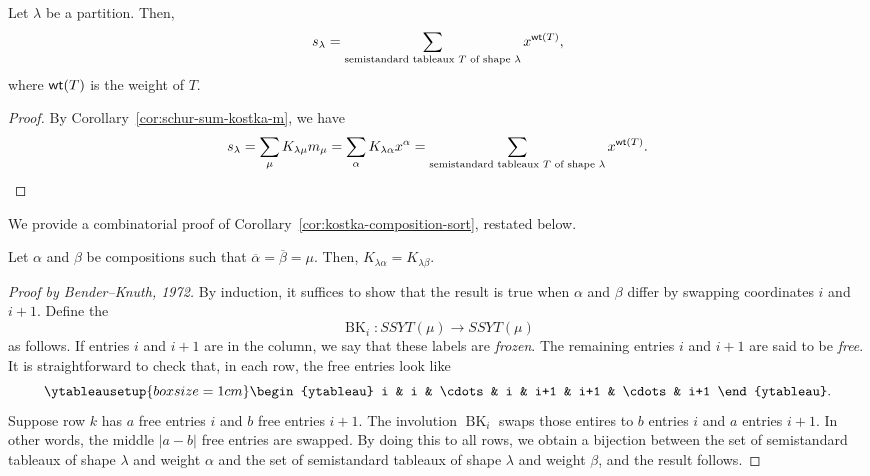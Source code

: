 \begin{corollary}
    Let \(\lambda\) be a partition.
    Then,
    \begin{equation}
        s_{\lambda} = \sum_{\text{semistandard tableaux } T \text{ of shape } \lambda} x^{\operatorname{\mathsf{wt}}(T)},
    \end{equation}
    where \(\operatorname{\mathsf{wt}}(T)\) is the weight of \(T\).
\end{corollary}

\begin{proof}
    By Corollary~\ref{cor:schur-sum-kostka-m}, we have
    \begin{equation}
        s_{\lambda} = \sum_{\mu} K_{\lambda \mu} m_{\mu}
        = \sum_{\alpha} K_{\lambda \alpha} x^{\alpha}
        = \sum_{\text{semistandard tableaux } T \text{ of shape } \lambda} x^{\operatorname{\mathsf{wt}}(T)}. \qedhere
    \end{equation}
\end{proof}

We provide a combinatorial proof of Corollary~\ref{cor:kostka-composition-sort}, restated below.
\begin{fact}
    Let \(\alpha\) and \(\beta\) be compositions such that \(\overline{\alpha} = \overline{\beta} = \mu\).  Then, \(K_{\lambda \alpha} = K_{\lambda \beta}\).
\end{fact}
\begin{proof}[Proof by Bender--Knuth, 1972]
    By induction, it suffices to show that the result is true when \(\alpha\) and \(\beta\) differ by swapping coordinates \(i\) and \(i+1\).
    Define the 
    \begin{equation}
        \operatorname{BK}_i \colon SSYT(\mu) \to SSYT(\mu)
    \end{equation}
    as follows.
    If entries \(i\) and \(i+1\) are in the column, we say that these labels are \emph{frozen}.
    The remaining entries \(i\) and \(i+1\) are said to be \emph{free}.
    It is straightforward to check that, in each row, the free entries look like
    \begin{equation}
        \ytableausetup{boxsize=1cm}
        \begin{ytableau}
            i & i & \cdots & i & i+1 & i+1 & \cdots & i+1
        \end{ytableau}.
    \end{equation}
    Suppose row \(k\) has \(a\) free entries \(i\) and \(b\) free entries \(i+1\).
    The involution \(\operatorname{BK}_i\) swaps those entires to \(b\) entries \(i\) and \(a\) entries \(i+1\).
    In other words, the middle \(|a-b|\) free entries are swapped.
    By doing this to all rows, we obtain a bijection between the set of semistandard tableaux of shape \(\lambda\) and weight \(\alpha\) and the set of semistandard tableaux of shape \(\lambda\) and weight \(\beta\), and the result follows.
\end{proof}

